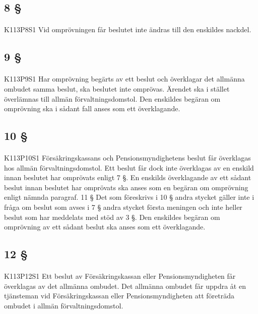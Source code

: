 \documentclass[a4paper,notitlepage,openany,10pt]{book}
\begin{document}
\subsection*{8 §}
\paragraph*{}
{\tiny K113P8S1}
Vid omprövningen får beslutet inte ändras till den enskildes nackdel.
\subsection*{9 §}
\paragraph*{}
{\tiny K113P9S1}
Har omprövning begärts av ett beslut och överklagar det allmänna ombudet samma beslut, ska beslutet inte omprövas.
Ärendet ska i stället överlämnas till allmän förvaltningsdomstol. Den enskildes begäran om omprövning ska i sådant fall anses som ett överklagande.
\subsection*{10 §}
\paragraph*{}
{\tiny K113P10S1}
Försäkringskassans och Pensionsmyndighetens beslut får överklagas hos allmän förvaltningsdomstol.
Ett beslut får dock inte överklagas av en enskild innan beslutet har omprövats enligt 7 §. En enskilds överklagande av ett sådant beslut innan beslutet har omprövats ska anses som en begäran om omprövning enligt nämnda paragraf. 11 § Det som föreskrivs i 10 § andra stycket gäller inte i fråga om beslut som avses i 7 § andra stycket första meningen och inte heller beslut som har meddelats med stöd av 3 §. Den enskildes begäran om omprövning av ett sådant beslut ska anses som ett överklagande.
\subsection*{12 §}
\paragraph*{}
{\tiny K113P12S1}
Ett beslut av Försäkringskassan eller Pensionsmyndigheten får överklagas av det allmänna ombudet.
Det allmänna ombudet får uppdra åt en tjänsteman vid Försäkringskassan eller Pensionsmyndigheten att företräda ombudet i allmän förvaltningsdomstol.
\end{document}
